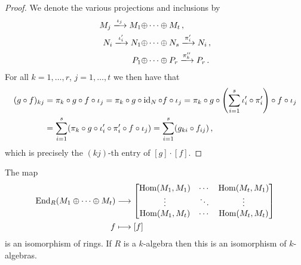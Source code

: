 \begin{proof}
  We denote the various projections and inclusions by
  \begin{align*}
                              M_j
    \xlongrightarrow{\iota_j} M_1 \oplus &\dotsb \oplus M_t \,,
    \\
                                N_i
    \xlongrightarrow{\iota'_i}  N_1 \oplus &\dotsb \oplus N_s
    \xlongrightarrow{\pi'_i}    N_i \,,
    \\
                              P_1 \oplus &\dotsb \oplus P_r
    \xlongrightarrow{\pi''_k} P_r \,.
  \end{align*}
  For all $k = 1, \dotsc, r$, $j = 1, \dotsc, t$ we then have that
  \begin{align*}
        (g \circ f)_{kj}
    &=  \pi_k \circ g \circ f \circ \iota_j
     =  \pi_k \circ g \circ \operatorname{id}_N \circ f \circ \iota_j
     =  \pi_k \circ g \circ \left( \sum_{i=1}^s \iota'_i \circ \pi'_i \right) \circ f \circ \iota_j \\
    &=  \sum_{i=1}^s ( \pi_k \circ g \circ \iota'_i \circ \pi'_i \circ f \circ \iota_j )
     =  \sum_{i=1}^s ( g_{ki} \circ f_{ij} ) \,,
  \end{align*}
  which is precisely the $(kj)$-th entry of $[g] \cdot [f]$.
\end{proof}


\begin{corollary}
  \label{corollary: endomorphisms of direct sum}
  The map
  \begin{align*}
              \operatorname{End}_R(M_1 \oplus \dotsb \oplus M_t)
    &\longrightarrow  \begin{bmatrix}
                \operatorname{Hom}(M_1, M_1)  & \cdots  & \operatorname{Hom}(M_t, M_1)  \\
                \vdots          & \ddots  & \vdots          \\
                \operatorname{Hom}(M_1, M_t)  & \cdots  & \operatorname{Hom}(M_t, M_t)
              \end{bmatrix}
    \\
                  f
    &\longmapsto  [f]
  \end{align*}
  is an isomorphism of rings.
  If $R$ is a $k$-algebra then this is an isomorphism of $k$-algebras.
\end{corollary}


